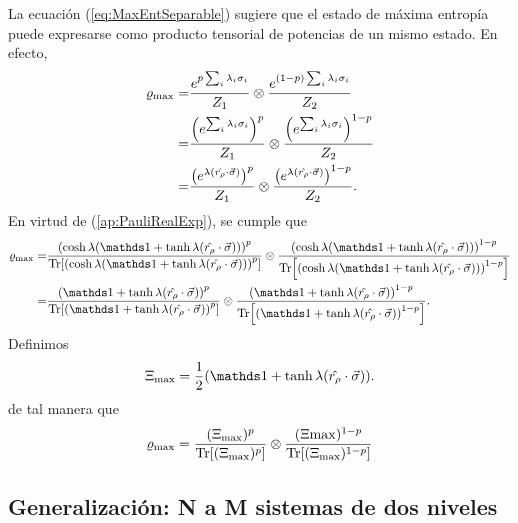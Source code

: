 La ecuación (\ref{eq:MaxEntSeparable}) sugiere que el estado de máxima entropía puede expresarse como producto tensorial de potencias de un mismo estado. En efecto,
\begin{align*}
  \varrho_{\max}=&\frac{e^{p\sum_{i}\lambda_{i}\sigma_{i}}}{Z_{1}} \otimes \frac{e^{(1-p)\sum_{i}\lambda_{i}\sigma_{i}}}{Z_{2}}\\
  =&\frac{\qty(e^{\sum_{i}\lambda_{i}\sigma_{i}})^{p} }{Z_{1}}\otimes \frac{\qty(e^{\sum_{i}\lambda_{i}\sigma_{i}})^{1-p}}{Z_{2}}\\
  =&\frac{\qty(e^{\lambda(\hat{r_{\rho}}\cdot\vec{\sigma})})^{p}}{Z_{1}} \otimes \frac{\qty(e^{\lambda(\hat{r_{\rho}}\cdot\vec{\sigma})})^{1-p}}{Z_{2}}.
\end{align*}
En virtud de (\ref*{ap:PauliRealExp}), se cumple que
\begin{align*}
  \varrho_{\max}=&\frac{\qty(\cosh{\lambda}(\Id+\tanh{\lambda}(\paulivec{r_{\rho}})))^{p}}{\Tr[\qty(\cosh{\lambda}(\Id+\tanh{\lambda}(\paulivec{r_{\rho}})))^{p}]} \otimes \frac{\qty(\cosh{\lambda}(\Id+\tanh{\lambda}(\paulivec{r_{\rho}})))^{1-p}}{\Tr[\qty(\cosh{\lambda}(\Id+\tanh{\lambda}(\paulivec{r_{\rho}})))^{1-p}]}\\
  =&\frac{\qty(\Id+\tanh{\lambda}(\paulivec{r_{\rho}}))^{p}}{\Tr[\qty(\Id+\tanh{\lambda}(\paulivec{r_{\rho}}))^{p}]} \otimes \frac{\qty(\Id+\tanh{\lambda}(\paulivec{r_{\rho}}))^{1-p}}{\Tr[\qty(\Id+\tanh{\lambda}(\paulivec{r_{\rho}}))^{1-p}]}.
\end{align*}
Definimos
\begin{equation}\label{eq:Xi}
  \Xi_{\max}=\frac{1}{2}(\Id+\tanh{\lambda}(\paulivec{r_{\rho}})).
\end{equation}
de tal manera que 
\begin{equation}\label{eq:MaxEntSeparablePower}
  \varrho_{\max}=\frac{(\Xi_{\max})^{p}}{\Tr[ (\Xi_{\max})^{p}]}\otimes\frac{(\Xi{\max})^{1-p}}{\Tr[(\Xi_{\max})^{1-p}]}
\end{equation}

\subsection{Generalización: N a M sistemas de dos niveles}

